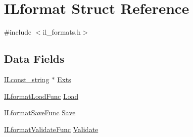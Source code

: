 \hypertarget{struct_i_lformat}{\section{I\-Lformat Struct Reference}
\label{struct_i_lformat}
}


{\ttfamily \#include $<$il\-\_\-formats.\-h$>$}

\subsection*{Data Fields}
\begin{DoxyCompactItemize}
\item 
\hyperlink{il_8h_a103ef32cc870d648d471aff6c7076747}{I\-Lconst\-\_\-string} $\ast$ \hyperlink{struct_i_lformat_ac3cb8461b06aa42024436cc85002a160}{Exts}
\item 
\hyperlink{il__formats_8h_a32f0181b7a526be24ee579f565b8e21c}{I\-Lformat\-Load\-Func} \hyperlink{struct_i_lformat_af88088c14ba8ceb50b8fd956af2510a9}{Load}
\item 
\hyperlink{il__formats_8h_ad1b6487004e2cb43e7a8e14f32a12ad3}{I\-Lformat\-Save\-Func} \hyperlink{struct_i_lformat_ae6b7a35103d102d22852f5f84b2f561a}{Save}
\item 
\hyperlink{il__formats_8h_aa720743d1bf85d492c8a527b9b253eb3}{I\-Lformat\-Validate\-Func} \hyperlink{struct_i_lformat_a2a3248b59dea172ddfa5ed87bf4ef26d}{Validate}
\end{DoxyCompactItemize}


